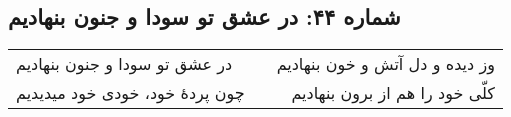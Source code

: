 \begin{center}
\section*{شماره ۴۴: در عشق تو سودا و جنون بنهادیم}
\label{sec:044}
\begin{longtable}{l p{0.5cm} r}
در عشق تو سودا و جنون بنهادیم
&&
وز دیده و دل آتش و خون بنهادیم
\\
چون پردهٔ خود، خودی خود میدیدیم
&&
کلّی خود را هم از برون بنهادیم
\\
\end{longtable}
\end{center}
